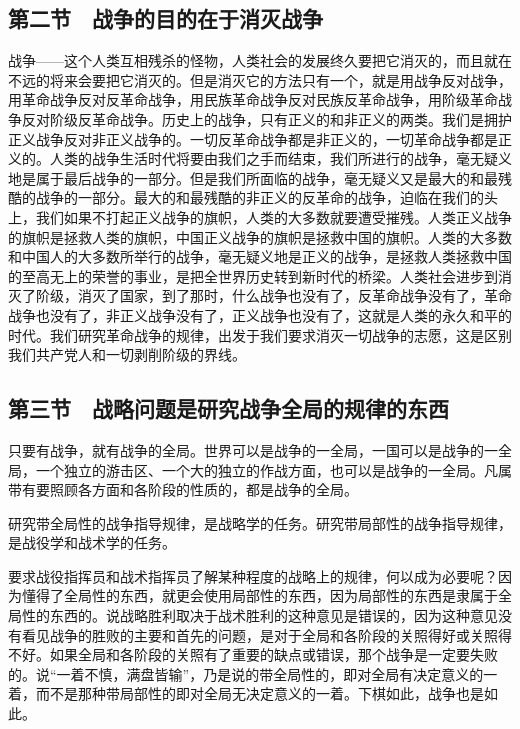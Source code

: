 \subsection{第二节　战争的目的在于消灭战争}

战争——这个人类互相残杀的怪物，人类社会的发展终久要把它消灭的，而且就在不远的将来会要把它消灭的。但是消灭它的方法只有一个，就是用战争反对战争，用革命战争反对反革命战争，用民族革命战争反对民族反革命战争，用阶级革命战争反对阶级反革命战争。历史上的战争，只有正义的和非正义的两类。我们是拥护正义战争反对非正义战争的。一切反革命战争都是非正义的，一切革命战争都是正义的。人类的战争生活时代将要由我们之手而结束，我们所进行的战争，毫无疑义地是属于最后战争的一部分。但是我们所面临的战争，毫无疑义又是最大的和最残酷的战争的一部分。最大的和最残酷的非正义的反革命的战争，迫临在我们的头上，我们如果不打起正义战争的旗帜，人类的大多数就要遭受摧残。人类正义战争的旗帜是拯救人类的旗帜，中国正义战争的旗帜是拯救中国的旗帜。人类的大多数和中国人的大多数所举行的战争，毫无疑义地是正义的战争，是拯救人类拯救中国的至高无上的荣誉的事业，是把全世界历史转到新时代的桥梁。人类社会进步到消灭了阶级，消灭了国家，到了那时，什么战争也没有了，反革命战争没有了，革命战争也没有了，非正义战争没有了，正义战争也没有了，这就是人类的永久和平的时代。我们研究革命战争的规律，出发于我们要求消灭一切战争的志愿，这是区别我们共产党人和一切剥削阶级的界线。

\subsection{第三节　战略问题是研究战争全局的规律的东西}

只要有战争，就有战争的全局。世界可以是战争的一全局，一国可以是战争的一全局，一个独立的游击区、一个大的独立的作战方面，也可以是战争的一全局。凡属带有要照顾各方面和各阶段的性质的，都是战争的全局。

研究带全局性的战争指导规律，是战略学的任务。研究带局部性的战争指导规律，是战役学和战术学的任务。

要求战役指挥员和战术指挥员了解某种程度的战略上的规律，何以成为必要呢？因为懂得了全局性的东西，就更会使用局部性的东西，因为局部性的东西是隶属于全局性的东西的。说战略胜利取决于战术胜利的这种意见是错误的，因为这种意见没有看见战争的胜败的主要和首先的问题，是对于全局和各阶段的关照得好或关照得不好。如果全局和各阶段的关照有了重要的缺点或错误，那个战争是一定要失败的。说“一着不慎，满盘皆输”，乃是说的带全局性的，即对全局有决定意义的一着，而不是那种带局部性的即对全局无决定意义的一着。下棋如此，战争也是如此。

